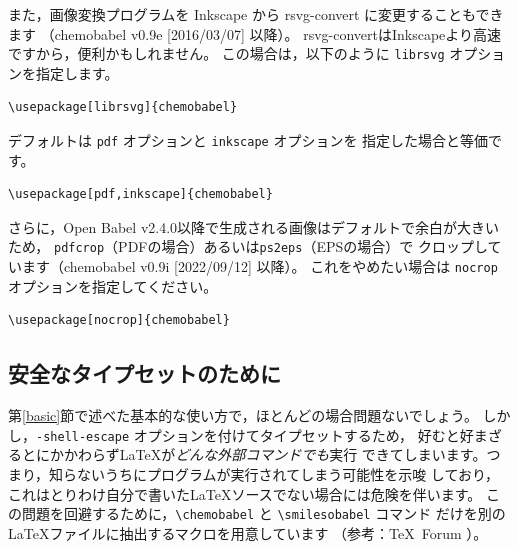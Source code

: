 \documentclass[12pt]{ltjsarticle}
\begin{document}
また，画像変換プログラムを Inkscape から rsvg-convert に変更することもできます
（\textsf{chemobabel} v0.9e [2016/03/07] 以降）。
rsvg-convertはInkscapeより高速ですから，便利かもしれません。
この場合は，以下のように \verb|librsvg| オプションを指定します。
\begin{verbatim}
\usepackage[librsvg]{chemobabel}
\end{verbatim}
デフォルトは \verb|pdf| オプションと \verb|inkscape| オプションを
指定した場合と等価です。
\begin{verbatim}
\usepackage[pdf,inkscape]{chemobabel}
\end{verbatim}

さらに，Open Babel v2.4.0以降で生成される画像はデフォルトで余白が大きいため，
\verb|pdfcrop|（PDFの場合）あるいは\verb|ps2eps|（EPSの場合）で
クロップしています（\textsf{chemobabel} v0.9i [2022/09/12] 以降）。
これをやめたい場合は \verb|nocrop| オプションを指定してください。
\begin{verbatim}
\usepackage[nocrop]{chemobabel}
\end{verbatim}

\clearpage

\subsection{安全なタイプセットのために}
\label{extract}

第\ref{basic}節で述べた基本的な使い方で，ほとんどの場合問題ないでしょう。
しかし，\verb|-shell-escape| オプションを付けてタイプセットするため，
好むと好まざるとにかかわらず\LaTeX が\emph{どんな外部コマンドでも}実行
できてしまいます。つまり，知らないうちにプログラムが実行されてしまう可能性を示唆
しており，これはとりわけ自分で書いた\LaTeX ソースでない場合には危険を伴います。
この問題を回避するために，\verb|\chemobabel| と \verb|\smilesobabel| コマンド
だけを別の \LaTeX ファイルに抽出するマクロを用意しています
（参考：\TeX\ Forum \cite{OKU}）。
\end{document}
